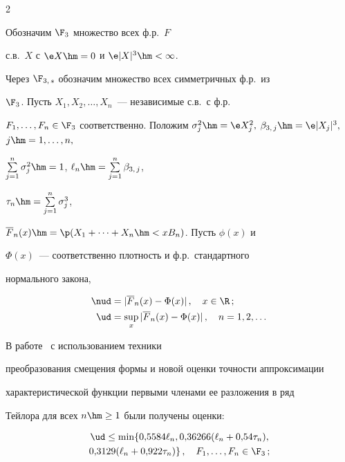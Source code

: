       \begin{multicols}{2}



            \label{st\stat}





Обозначим $\F_3$ множество всех ф.р.~$F$

с.в.~$X$ с ${\e X\hm=0}$ и ${\e|X|^3\hm< \infty}$.

Через $\F_{3,\,s}$ обозначим множество всех симметричных ф.р.\ из

$\F_3$. Пусть $X_1,X_2,\ldots,X_n$~--- независимые с.в.\ с ф.р.\

$F_1,\ldots,F_n\in\F_3$ соответственно. Положим $\sigma_j^2\hm= \e

X_j^2,$ $\beta_{3,\,j}\hm=\e|X_j|^3,$ $j\hm=1,\ldots,n,$

$\sum\limits_{j=1}^n\sigma_j^2\hm=1$, $\ell_n\hm=\sum\limits_{j=1}^n\beta_{3,\,j}$,

$\tau_n\hm=\sum\limits_{j=1}^n\sigma_j^3$,

$\overline F_n(x)\hm=\p(X_1+\cdots+X_n\hm<xB_n)$. Пусть $\phi(x)$ и

$\Phi(x)$~--- соответственно плотность и ф.р.\ стандартного

нормального закона,

\begin{align*}

\nud&=|\overline F_n(x)-\Phi(x)|\,,\quad x\in\R\,;\\

\ud &=\sup\limits_x|\overline F_n(x)-\Phi(x)|\,,\quad n=1,2,\ldots\,

\end{align*}



В работе~\cite{Shevtsova2012ISSPSM3} с использованием техники

преобразования смещения формы и новой оценки точности аппроксимации

характеристической функции первыми членами ее разложения в ряд

Тейлора для всех $n\hm\ge1$ были получены оценки:

\begin{multline*}

\ud\le \min\{0{,}5584\ell_n, 0{,}36266(\ell_n+0{,}54\tau_n),\\

0{,}3129(\ell_n+0{,}922\tau_n)\}\,,\quad F_1,\ldots,F_n\in\F_3\,;


\end{multline*}
\end{multicols}
